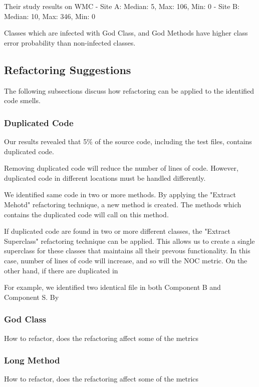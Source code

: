 Their study results on WMC
- Site A: Median: 5, Max: 106, Min: 0
- Site B: Median: 10, Max: 346, Min: 0









Classes which are infected with God Class, and God Methods have higher class error probability than non-infected classes.




\subsection{Refactoring Suggestions}
The following subsections discuss how refactoring can be applied to the identified code smells.

\subsubsection{Duplicated Code}
Our results revealed that 5\% of the source code, including the test files, contains duplicated code. 

Removing duplicated code will reduce the number of lines of code. However, duplicated code in different locations must be handled differently.

We identified same code in two or more methods. By applying the "Extract Mehotd" refactoring technique, a new method is created. The methods which contains the duplicated code will call on this method.

If duplicated code are found in two or more different classes, the "Extract Superclass" refactoring technique can be applied. This allows us to create a single superclass for these classes that maintains all their prevous functionality. In this case, number of lines of code will increase, and so will the NOC metric. On the other hand, if there are duplicated in

For example, we identified two identical file in both Component B and Component S. By 

\subsubsection{God Class}
How to refactor, does the refactoring affect some of the metrics

\subsubsection{Long Method}
How to refactor, does the refactoring affect some of the metrics


